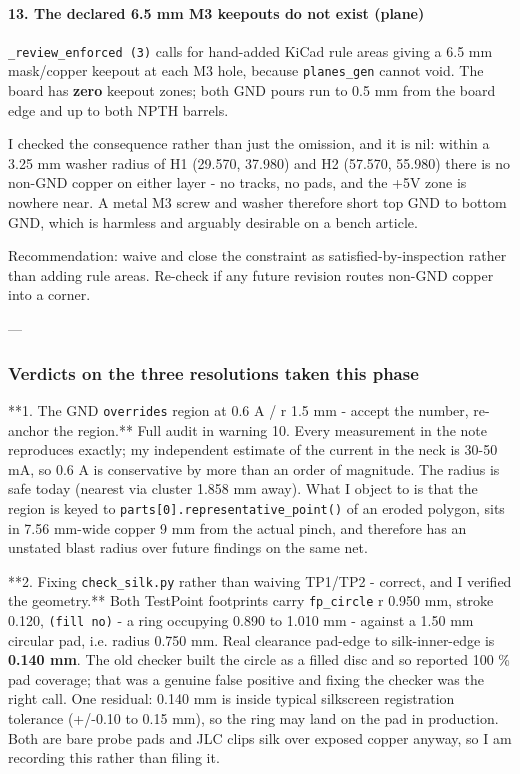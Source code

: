 \documentclass[11pt,a4paper]{article}
\begin{document}
\paragraph*{13. The declared 6.5 mm M3 keepouts do not exist (plane)}
\texttt{\_review\_enforced (3)} calls for hand-added KiCad rule areas giving a 6.5 mm mask/copper keepout at each M3 hole, because \texttt{planes\_gen} cannot void. The board has \textbf{zero} keepout zones; both GND pours run to 0.5 mm from the board edge and up to both NPTH barrels.

I checked the consequence rather than just the omission, and it is nil: within a 3.25 mm washer radius of H1 (29.570, 37.980) and H2 (57.570, 55.980) there is no non-GND copper on either layer - no tracks, no pads, and the +5V zone is nowhere near. A metal M3 screw and washer therefore short top GND to bottom GND, which is harmless and arguably desirable on a bench article.

Recommendation: waive and close the constraint as satisfied-by-inspection rather than adding rule areas. Re-check if any future revision routes non-GND copper into a corner.

---

\subsubsection*{Verdicts on the three resolutions taken this phase}
{*}{*}1. The GND \texttt{overrides} region at 0.6 A / r 1.5 mm - accept the number, re-anchor the region.{*}{*} Full audit in warning 10. Every measurement in the note reproduces exactly; my independent estimate of the current in the neck is 30-50 mA, so 0.6 A is conservative by more than an order of magnitude. The radius is safe today (nearest via cluster 1.858 mm away). What I object to is that the region is keyed to \texttt{parts{[}0{]}.representative\_point()} of an eroded polygon, sits in 7.56 mm-wide copper 9 mm from the actual pinch, and therefore has an unstated blast radius over future findings on the same net.

{*}{*}2. Fixing \texttt{check\_silk.py} rather than waiving TP1/TP2 - correct, and I verified the geometry.{*}{*} Both TestPoint footprints carry \texttt{fp\_circle} r 0.950 mm, stroke 0.120, \texttt{(fill no)} - a ring occupying 0.890 to 1.010 mm - against a 1.50 mm circular pad, i.e. radius 0.750 mm. Real clearance pad-edge to silk-inner-edge is \textbf{0.140 mm}. The old checker built the circle as a filled disc and so reported 100 \% pad coverage; that was a genuine false positive and fixing the checker was the right call. One residual: 0.140 mm is inside typical silkscreen registration tolerance (+/-0.10 to 0.15 mm), so the ring may land on the pad in production. Both are bare probe pads and JLC clips silk over exposed copper anyway, so I am recording this rather than filing it.
\end{document}
